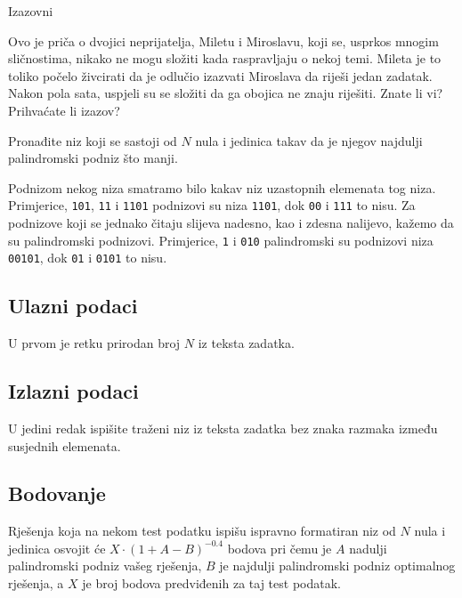 \begin{statement}[
  problempoints=100,
  timelimit=5 sekundi,
  memorylimit=512 MiB,
]{Izazovni}

Ovo je priča o dvojici neprijatelja, Miletu i Miroslavu, koji se, usprkos
mnogim sličnostima, nikako ne mogu složiti kada raspravljaju o nekoj temi.
Mileta je to toliko počelo živcirati da je odlučio izazvati Miroslava da
riješi jedan zadatak.  Nakon pola sata, uspjeli su se složiti da ga obojica
ne znaju riješiti.  Znate li vi? Prihvaćate li izazov?

Pronađite niz koji se sastoji od $N$ nula i jedinica takav da je njegov najdulji
palindromski podniz što manji.

Podnizom nekog niza smatramo bilo kakav niz uzastopnih elemenata tog niza.
Primjerice, \texttt{101}, \texttt{11} i \texttt{1101} podnizovi su niza
\texttt{1101}, dok \texttt{00} i \texttt{111} to nisu. Za podnizove koji se
jednako čitaju slijeva nadesno, kao i zdesna nalijevo, kažemo da su
palindromski podnizovi. Primjerice, \texttt{1} i \texttt{010} palindromski su
podnizovi niza \texttt{00101}, dok \texttt{01} i \texttt{0101} to nisu.

\subsection*{Ulazni podaci}
U prvom je retku prirodan broj $N$ iz teksta zadatka.

\subsection*{Izlazni podaci}
U jedini redak ispišite traženi niz iz teksta zadatka bez znaka razmaka
između susjednih elemenata.

\subsection*{Bodovanje}
Rješenja koja na nekom test podatku ispišu ispravno formatiran niz od $N$ nula
i jedinica osvojit će $X\cdot(1+A-B)^{-0.4}$ bodova pri čemu je $A$ nadulji
palindromski podniz vašeg rješenja, $B$ je najdulji palindromski podniz
optimalnog rješenja, a $X$ je broj bodova predviđenih za taj test podatak.


\end{statement}
